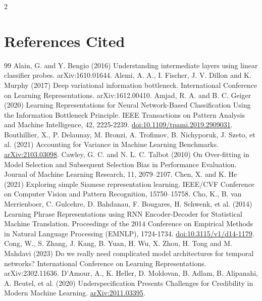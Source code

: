 \documentclass[a4paper,10pt,fleqn]{article}
\begin{document}
\begin{multicols}{2}
\section*{References Cited}
\begingroup
\renewcommand{\section}[2]{}
\begin{thebibliography}{99}
\setlength{\itemsep}{0pt}\setlength{\parsep}{0pt}
 Alain, G. and Y. Bengio (2016) Understanding intermediate layers using linear classifier probes. arXiv:1610.01644.
 Alemi, A. A., I. Fischer, J. V. Dillon and K. Murphy (2017) Deep variational information bottleneck. International Conference on Learning Representations. arXiv:1612.00410.
 Amjad, R. A. and B. C. Geiger (2020) Learning Representations for Neural Network-Based Classification Using the Information Bottleneck Principle. IEEE Transactions on Pattern Analysis and Machine Intelligence, 42, 2225-2239. \href{https://doi.org/10.1109/tpami.2019.2909031}{doi:10.1109/tpami.2019.2909031}.
 Bouthillier, X., P. Delaunay, M. Bronzi, A. Trofimov, B. Nichyporuk, J. Szeto, et al. (2021) Accounting for Variance in Machine Learning Benchmarks. \href{https://arxiv.org/abs/2103.03098}{arXiv:2103.03098}.
 Cawley, G. C. and N. L. C. Talbot (2010) On Over-fitting in Model Selection and Subsequent Selection Bias in Performance Evaluation. Journal of Machine Learning Research, 11, 2079--2107.
 Chen, X. and K. He (2021) Exploring simple Siamese representation learning. IEEE/CVF Conference on Computer Vision and Pattern Recognition, 15750--15758.
 Cho, K., B. van Merrienboer, C. Gulcehre, D. Bahdanau, F. Bougares, H. Schwenk, et al. (2014) Learning Phrase Representations using RNN Encoder-Decoder for Statistical Machine Translation. Proceedings of the 2014 Conference on Empirical Methods in Natural Language Processing (EMNLP), 1724-1734. \href{https://doi.org/10.3115/v1/d14-1179}{doi:10.3115/v1/d14-1179}.
 Cong, W., S. Zhang, J. Kang, B. Yuan, H. Wu, X. Zhou, H. Tong and M. Mahdavi (2023) Do we really need complicated model architectures for temporal networks? International Conference on Learning Representations. arXiv:2302.11636.
 D'Amour, A., K. Heller, D. Moldovan, B. Adlam, B. Alipanahi, A. Beutel, et al. (2020) Underspecification Presents Challenges for Credibility in Modern Machine Learning. \href{https://arxiv.org/abs/2011.03395}{arXiv:2011.03395}.

\end{thebibliography}
\end{multicols}
\end{document}
